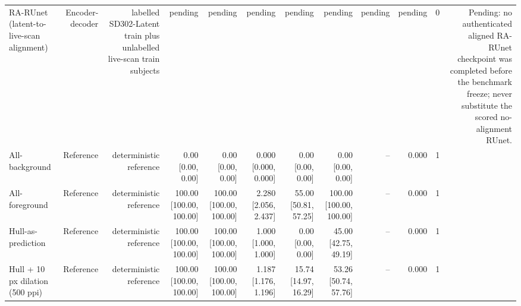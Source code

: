 \begin{table}[t]
\begin{tabular}{lrrrrrrrrrrr}
RA-RUnet (latent-to-live-scan alignment) & Encoder-decoder & labelled SD302-Latent train plus unlabelled live-scan train subjects & pending & pending & pending & pending & pending & pending & pending & 0 & Pending: no authenticated aligned RA-RUnet checkpoint was completed before the benchmark freeze; never substitute the scored no-alignment RUnet. \\
All-background & Reference & deterministic reference & 0.00 [0.00, 0.00] & 0.00 [0.00, 0.00] & 0.000 [0.000, 0.000] & 0.00 [0.00, 0.00] & 0.00 [0.00, 0.00] & -- & 0.000 & 1 &  \\
All-foreground & Reference & deterministic reference & 100.00 [100.00, 100.00] & 100.00 [100.00, 100.00] & 2.280 [2.056, 2.437] & 55.00 [50.81, 57.25] & 100.00 [100.00, 100.00] & -- & 0.000 & 1 &  \\
Hull-as-prediction & Reference & deterministic reference & 100.00 [100.00, 100.00] & 100.00 [100.00, 100.00] & 1.000 [1.000, 1.000] & 0.00 [0.00, 0.00] & 45.00 [42.75, 49.19] & -- & 0.000 & 1 &  \\
Hull + 10 px dilation (500 ppi) & Reference & deterministic reference & 100.00 [100.00, 100.00] & 100.00 [100.00, 100.00] & 1.187 [1.176, 1.196] & 15.74 [14.97, 16.29] & 53.26 [50.74, 57.76] & -- & 0.000 & 1 &  \\
\bottomrule
\end{tabular}
\end{table}

